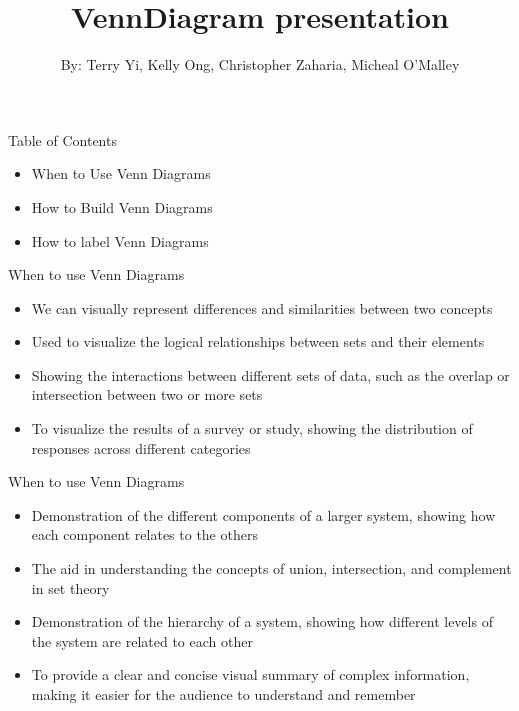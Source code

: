\documentclass{beamer}
\title{VennDiagram presentation}
\author{By: Terry Yi, Kelly Ong, Christopher Zaharia, Micheal O'Malley}
\begin{document}
	
	\frame{\titlepage}
	\begin{frame}[t,label=frameA] {Table of Contents}
		\begin{itemize}
			\item{When to Use Venn Diagrams}
			\item{How to Build Venn Diagrams}
			\item{How to label Venn Diagrams}
		\end{itemize}
	\end{frame}
	\begin{frame}[t,label=frameA]{When to use Venn Diagrams}
		\begin{itemize}
			\item {We can visually represent differences and similarities between two concepts}
			\item {Used to visualize the logical relationships between sets and their elements}
			\item {Showing the interactions between different sets of data, such as the overlap or intersection between two or more sets}
			\item {To visualize the results of a survey or study, showing the distribution of responses across different categories}
		\end{itemize}
	\end{frame}
	\begin{frame}[t,label=frameA]{When to use Venn Diagrams}
		\begin{itemize}
			\item {Demonstration of the different components of a larger system, showing how each component relates to the others}
			\item {The aid in understanding the concepts of union, intersection, and complement in set theory}
			\item {Demonstration of the hierarchy of a system, showing how different levels of the system are related to each other}
			\item {To provide a clear and concise visual summary of complex information, making it easier for the audience to understand and remember}
		\end{itemize}
	\end{frame}
\end{document}

